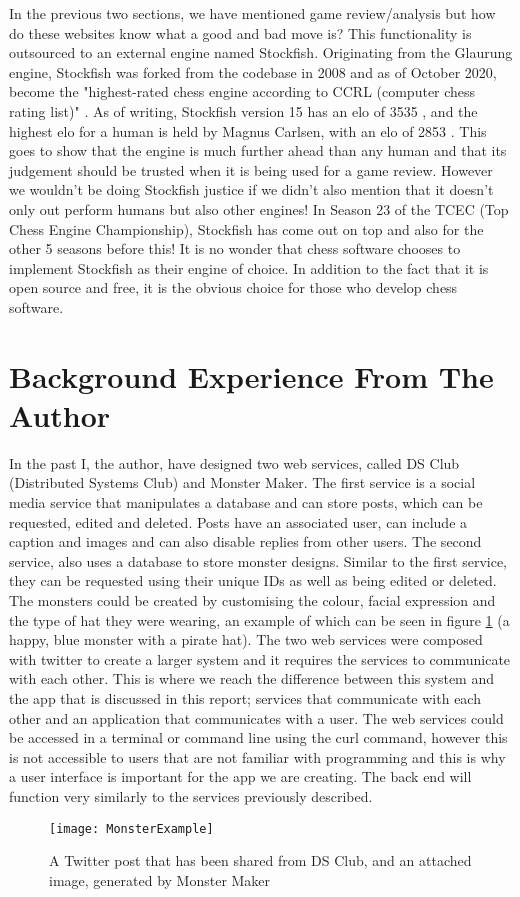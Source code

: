 In the previous two sections, we have mentioned game review/analysis but how do these websites know what a good and bad move is? This functionality is outsourced to an external engine named Stockfish. \cite{Stockfish} Originating from the Glaurung engine, Stockfish was forked from the codebase in 2008 and as of October 2020, become the "highest-rated chess engine according to CCRL (computer chess rating list)" \cite{Chess.comStockfish}. As of writing, Stockfish version 15 has an elo of 3535 \cite{StockfishElo}, and the highest elo for a human is held by Magnus Carlsen, with an elo of 2853 \cite{MagnusElo}. This goes to show that the engine is much further ahead than any human and that its judgement should be trusted when it is being used for a game review. However we wouldn't be doing Stockfish justice if we didn't also mention that it doesn't only out perform humans but also other engines! In Season 23 of the TCEC (Top Chess Engine Championship), Stockfish has come out on top \cite{TCECS23SuperFinal} and also for the other 5 seasons before this! It is no wonder that chess software chooses to implement Stockfish as their engine of choice. In addition to the fact that it is open source and free, it is the obvious choice for those who develop chess software.

\section{Background Experience From The Author}

In the past I, the author, have designed two web services, called DS Club (Distributed Systems Club) and Monster Maker. The first service is a social media service that manipulates a database and can store posts, which can be requested, edited and deleted. Posts have an associated user, can include a caption and images and can also disable replies from other users. The second service, also uses a database to store monster designs. Similar to the first service, they can be requested using their unique IDs as well as being edited or deleted. The monsters could be created by customising the colour, facial expression and the type of hat they were wearing, an example of which can be seen in figure \ref{MonsterExample} (a happy, blue monster with a pirate hat). The two web services were composed with twitter to create a larger system and it requires the services to communicate with each other. This is where we reach the difference between this system and the app that is discussed in this report; services that communicate with each other and an application that communicates with a user. The web services could be accessed in a terminal or command line using the curl command, however this is not accessible to users that are not familiar with programming and this is why a user interface is important for the app we are creating. The back end will function very similarly to the services previously described.

\begin{figure}[h]
    \begin{center}
        \texttt{[image: MonsterExample]}
        \caption{A Twitter post that has been shared from DS Club, and an attached image, generated by Monster Maker}
        \label{MonsterExample}
    \end{center}
\end{figure}